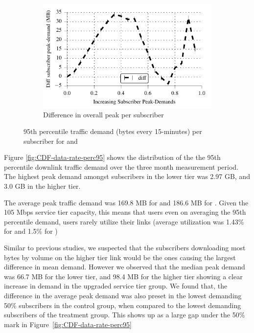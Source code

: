 \begin{figure}[t]
\begin{minipage}{1\linewidth}
\begin{subfigure}[b]{1\linewidth}
\includegraphics[width=\linewidth]{figures/diff_perc95_bytes_subsc-overall.pdf}
               \caption{Difference in overall peak per subscriber\label{fig:diff-peak-overall}}
\end{subfigure}
%
\end{minipage}
\caption{95th percentile traffic demand (bytes every 15-minutes) per subscriber for \control{} and \treatment{}\label{fig:traffic-demand-overall}}
\end{figure}

Figure \ref{fig:CDF-data-rate-perc95} shows the distribution of the
the 95th percentile downlink traffic demand 
over the three month measurement period. The highest peak
demand amongst subscribers in the lower tier was 2.97 GB,
and 3.0 GB in the higher tier.

The average peak traffic demand was 169.8 MB for \control{} and
186.6 MB for \treatment{}. Given the 105 Mbps service tier capacity,
this means that users even on averaging the 95th percentile demand,
users rarely utilize their links (average utilization was 1.43\%
for \control{} and 1.5\% for \treatment{})

Similar to previous studies, we suspected that the subscribers downloading most bytes
by volume on the higher tier link would be the ones causing the largest difference
in mean demand. However we observed that the median peak demand 
was 66.7 MB for the lower tier, and 98.4 MB for the higher tier
showing a clear increase in demand in the upgraded service tier
group. We found that, the difference in the average peak demand
was also preset in the lowest demanding 50\% subscribers
in the control group, when compared to the lowest demanding subscribers of the treatment
group. This shows up as a large gap under the 50\% mark in Figure~\ref{fig:CDF-data-rate-perc95}


